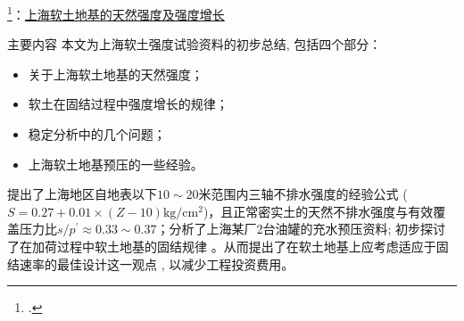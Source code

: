 \iffalse
\begin{frame}{\citet{Dassargues1991}: \href{run:./papers/Dassargues1991-Geotechnical properties of the Quaternary sediments in Shanghai.pdf}{上海第四纪沉积物的岩土特性}}
    \begin{block}{结论}
        在通过数学模型计算地面沉降之前，可以指出一些有关上海中心地区全新世和上更新世沉积物特征的主要事实。

        \begin{itemize}
            \item 主要细分是从岩性第四纪分析中得出的，并且通过工程地质和岩土工程测试的结果得到了充分的确认和详细说明。

            \item 对于序列的不同单位，已经获得了水文地质参数和工程地质参数，因为它们是沉降计算所必需的。

            \item 似乎变化的沉积条件已导致不同单元的几何复杂分布。 这种分布会影响不同区域的压实值。 例如，缺乏DGSC层和/或第一蓄水层将在理论上增加有关区域的沉降值。 相反，第一蓄水层和第二蓄水层之间的连接（在这种情况下，第三水层可压缩性缺失，并且在某些地方发生了与``黄浦江''有关但在第一压层中包括的潜水含水层， 当然，可压缩层相对可变的厚度及其最终的有机物含量也会极大地影响沉降现象。
        \end{itemize}

        根据这些结论，可以绘制一张地图，表示对沉降现象更敏感的区域（图12）。

    \end{block}
\end{frame}\fi

\begin{frame}{\footcite{Hu1979}：\href{run:./papers/Hu1979-上海软土地基的天然强度及强度增长.pdf}{上海软土地基的天然强度及强度增长}}
    \begin{block}{主要内容}
        本文为上海软土强度试验资料的初步总结, 包括四个部分：
        \begin{itemize}
            \item 关于上海软土地基的天然强度；
            \item 软土在固结过程中强度增长的规律；
            \item 稳定分析中的几个问题；
            \item 上海软土地基预压的一些经验。
        \end{itemize}
        
        提出了上海地区自地表以下$10\sim 20$米范围内三轴不排水强度的经验公式 ($S=0.27+0.01\times(Z-10)\mathrm{kg/cm^2}$)，且正常密实土的天然不排水强度与有效覆盖压力比$s/p^\prime\approx 0.33\sim 0.37$；分析了上海某厂2台油罐的充水预压资料; 初步探讨了在加荷过程中软土地基的固结规律 。从而提出了在软土地基上应考虑适应于固结速率的最佳设计这一观点 , 以减少工程投资费用。
    \end{block}
\end{frame}

